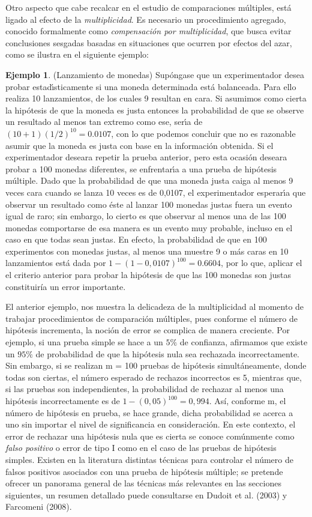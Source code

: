 \documentclass{article}
\theoremstyle{definition}
\newtheorem{ej}{Ejemplo}[section]
\begin{document}
Otro aspecto que cabe recalcar en el estudio de comparaciones múltiples, está ligado al efecto de la \textit{multiplicidad}. Es necesario un procedimiento agregado, conocido formalmente como \textit{compensación por multiplicidad},
que busca evitar conclusiones sesgadas basadas en situaciones que ocurren por efectos del azar, como se
ilustra en el siguiente ejemplo:
\begin{ej}(Lanzamiento de monedas)
	\label{monedas}
		Supóngase que un experimentador desea probar estadı́sticamente si una moneda determinada está balanceada.
		Para ello realiza 10 lanzamientos, de los cuales 9 resultan en cara. Si asumimos como cierta la hipótesis
		de que la moneda es justa entonces la probabilidad de que se observe un resultado al menos tan extremo
		como ese, serı́a de $(10 + 1)(1/2)^{10} = 0.0107$, con lo que podemos concluir que no es razonable asumir que
		la moneda es justa con base en la información obtenida. Si el experimentador deseara repetir la prueba anterior, pero esta ocasión deseara probar a 100
		monedas diferentes, se enfrentarı́a a una prueba de hipótesis múltiple. Dado que la probabilidad de que
		una moneda justa caiga al menos 9 veces cara cuando se lanza 10 veces es de 0,0107, el experimentador
		esperarı́a que observar un resultado como éste al lanzar 100 monedas justas fuera un evento igual de
		raro; sin embargo, lo cierto es que observar al menos una de las 100 monedas comportarse de esa manera
		es un evento muy probable, incluso en el caso en que todas sean justas. En efecto, la probabilidad de
		que en 100 experimentos con monedas justas, al menos una muestre 9 o más caras en 10 lanzamientos
está dada por	
		$1 - (1 - 0,0107)^{100}= 0.6604$, por lo que, aplicar el el criterio anterior para probar la hipótesis de que
		las 100 monedas son justas constituiría un error importante.
\end{ej}
El anterior ejemplo, nos muestra la delicadeza de la multiplicidad al momento de trabajar procedimientos de comparación múltiples, pues conforme el número de hipótesis
incrementa, la noción de error se complica de manera creciente. Por ejemplo, si una prueba simple se
hace a un $5\%$ de confianza, afirmamos que existe un $95\%$ de probabilidad de que la hipótesis nula sea
rechazada incorrectamente. Sin embargo, si se realizan m = 100 pruebas de hipótesis simultáneamente,
donde todas son ciertas, el número esperado de rechazos incorrectos es 5, mientras que, si las pruebas son
independientes, la probabilidad de rechazar al menos una hipótesis incorrectamente es de $1 - (0,05)^{100} =
0,994$. Así, conforme m, el número de hipótesis en prueba, se hace grande, dicha
probabilidad se acerca a uno sin importar el nivel de significancia en consideración. En este contexto,
el error de rechazar una hipótesis nula que es cierta se conoce comúnmente como \textit{falso positivo} o error
de tipo I como en el caso de las pruebas de hipótesis simples. Existen en la literatura distintas técnicas
para controlar el número de falsos positivos asociados con una prueba de hipótesis múltiple; se pretende
ofrecer un panorama general de las técnicas más relevantes en las secciones siguientes, un resumen
detallado puede consultarse en Dudoit et al. (2003) y Farcomeni (2008).
\end{document}
